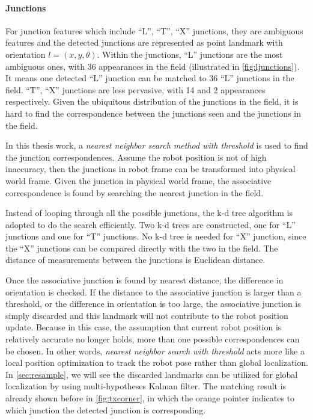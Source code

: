 \paragraph{Junctions}
For junction features which include ``L'', ``T'', ``X'' junctions, they are ambiguous features and the detected junctions are represented as point landmark with orientation $l = (x, y, \theta)$. Within the junctions, ``L'' junctions are the most ambiguous ones, with 36 appearances in the field (illustrated in \autoref{fig:ljunctions}). It means one detected ``L'' junction can be matched to 36 ``L'' junctions in the field. ``T'', ``X'' junctions are less pervasive, with 14 and 2 appearances respectively. Given the ubiquitous distribution of the junctions in the field, it is hard to find the correspondence between the junctions seen and the junctions in the field. 

In this thesis work, a \textit{nearest neighbor search method with threshold} is used to find the junction correspondences. Assume the robot position is not of high inaccuracy, then the junctions in robot frame can be transformed into physical world frame. Given the junction in physical world frame, the associative correspondence is found by searching the nearest junction in the field. 

Instead of looping through all the possible junctions, the k-d tree algorithm \cite{Bentley1975} is adopted to do the search efficiently. Two k-d trees are constructed, one for ``L'' junctions and one for ``T'' junctions. No k-d tree is needed for ``X'' junction, since the ``X'' junctions can be compared directly with the two in the field. The distance of measurements between the junctions is Euclidean distance. 

Once the associative junction is found by nearest distance, the difference in orientation is checked. If the distance to the associative junction is larger than a threshold, or the difference in orientation is too large, the associative junction is simply discarded and this landmark will not contribute to the robot position update.
Because in this case, the assumption that current robot position is relatively accurate no longer holds, more than one possible correspondences can be chosen. In other words, \textit{nearest neighbor search with threshold} acts more like a local position optimization to track the robot pose rather than global localization. In \autoref{sec:resample}, we will see the discarded landmarks can be utilized for global localization by using multi-hypotheses Kalman filter. The matching result is already shown before in \autoref{fig:txcorner}, in which the orange pointer indicates to which junction the detected junction is corresponding.

